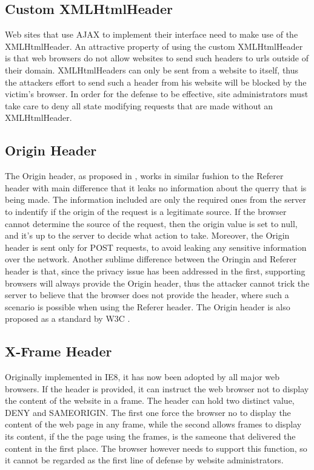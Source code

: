\subsection{Custom XMLHtmlHeader}
Web sites that use AJAX to implement their interface need to make use of the XMLHtmlHeader.  An attractive property of
using the custom XMLHtmlHeader is that web browsers do not allow websites to send such headers to urls outside of their
domain.  XMLHtmlHeaders can only be sent from a website to itself, thus the attackers effort to send such a header from
his website will be blocked by the victim's browser.  In order for the defense to be effective, site administrators must
take care to deny all state modifying requests that are made without an XMLHtmlHeader.

\subsection{Origin Header}
The Origin header, as proposed in \cite{Barth:2008:RDC:1455770.1455782}, works in similar fushion to the Referer header with
main difference that it leaks no information about the querry that is being made.  The information included are only the required
ones from the server to indentify if the origin of the request is a legitimate source.  If the browser cannot determine the
source of the request, then the origin value is set to null, and it's up to the server to decide what action to take.  
Moreover, the Origin header  is sent only for POST requests, to avoid leaking any sensitive information over the network.
Another sublime difference between the Oringin and Referer header is that, since the privacy issue has been addressed in
the first, supporting browsers will always provide the Origin header, thus the attacker cannot trick the server to believe
that the browser does not provide the header, where such a scenario is possible when using the Referer header.  The Origin
header is also proposed as a standard by W3C \cite{website:w3c-cors}. 

\subsection{X-Frame Header}
Originally implemented in IE8, it has now been adopted by all major web browsers.  If the header is provided, it can
instruct the web browser not to display the content of the website in a frame.  The header can hold two distinct value,
DENY and SAMEORIGIN.  The first one force the browser no to display the content of the web page in any frame, while the
second allows frames to display its content,  if the the page using the frames, is the sameone that delivered the content
in the first place.  The browser however needs to support this function, so it cannot be regarded as the first line of
defense by website administrators.

